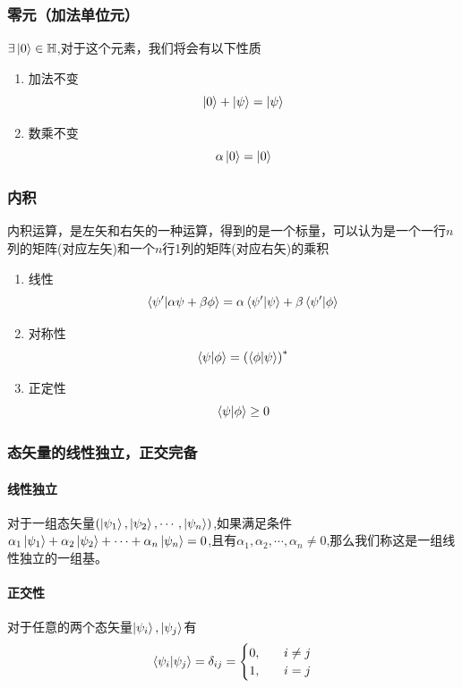 \documentclass{article}
\newcommand{\bb}[1]{\mathbb{#1}}
\begin{document}
\subsubsection{零元（加法单位元）}
$\exists\ket{0}\in\bb{H}$,对于这个元素，我们将会有以下性质
\begin{enumerate}
    \item 加法不变\[\ket{0}+\ket{\psi}=\ket{\psi}\]
    \item 数乘不变\[\alpha\ket{0}=\ket{0}\]
\end{enumerate}

\subsubsection{内积}
内积运算，是左矢和右矢的一种运算，得到的是一个标量，可以认为是一个一行$n$列的矩阵(对应左矢)和一个$n$行1列的矩阵(对应右矢)的乘积
\begin{enumerate}
    \item 线性\[\braket{\psi'}{\alpha\psi+\beta\phi}=\alpha\braket{\psi'}{\psi}+\beta\braket{\psi'}{\phi}\]
    \item 对称性\[\braket{\psi}{\phi}=\left(\braket{\phi}{\psi}\right)^*\]
    \item 正定性\[\braket{\psi}{\phi}\geq 0\]
\end{enumerate}

\subsubsection{态矢量的线性独立，正交完备}
\paragraph{线性独立}对于一组态矢量$(\ket{\psi_1},\ket{\psi_2},\cdots,\ket{\psi_n})$,如果满足条件$\alpha_1\ket{\psi_1}+\alpha_2\ket{\psi_2}+\cdots+\alpha_n\ket{\psi_n}=0$,且有$\alpha_1,\alpha_2,\cdots,\alpha_n\neq 0$,那么我们称这是一组线性独立的一组基。

\paragraph{正交性}对于任意的两个态矢量$\ket{\psi_i},\ket{\psi_j}$有
\begin{equation*}
\braket{\psi_i}{\psi_j}=\delta_{ij}=
\begin{cases}
    0,&\quad i\neq j\\
    1,&\quad i=j
\end{cases}
\end{equation*}
\end{document}
